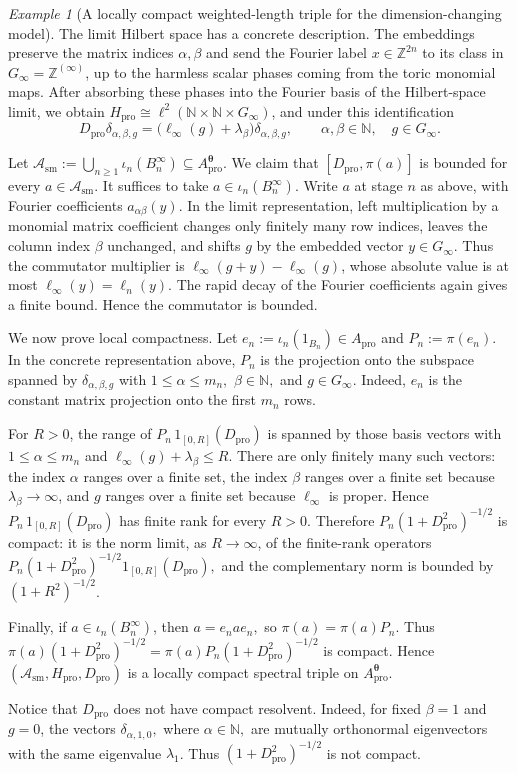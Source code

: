 \documentclass[11pt]{amsart}
\theoremstyle{definition}
\theoremstyle{remark}
\newtheorem{example}[theorem]{Example}
\newcommand{\Z}{\mathbb{Z}}
\newcommand{\N}{\mathbb N}
\newcommand{\ex}{\mathrm{pro}}
\begin{document}
\begin{example}[A locally compact weighted-length triple for the dimension-changing model]
The limit Hilbert space has a concrete description. The embeddings preserve the matrix indices $\alpha,\beta$ and send the
Fourier label $x\in\Z^{2n}$ to its class in
$G_\infty=\Z^{(\infty)}$, up to the harmless scalar phases coming from the
toric monomial maps. After absorbing these phases into the Fourier basis of the
Hilbert-space limit, we obtain $H_{\ex}\cong \ell^2(\N\times\N\times G_\infty)$,
and under this identification
\[
D_{\ex}\delta_{\alpha,\beta,g}
=
\bigl(\ell_\infty(g)+\lambda_\beta\bigr)
\delta_{\alpha,\beta,g},
\qquad
\alpha,\beta\in\N,\quad g\in G_\infty.
\]

Let $\mathcal A_{\mathrm{sm}}:=\bigcup_{n\geq1}\iota_n(B_n^\infty)
\subseteq A_{\ex}^{\boldsymbol\theta}.$
We claim that $[D_{\ex},\pi(a)]$
is bounded for every $a\in\mathcal A_{\mathrm{sm}}$. It suffices to take
$a\in\iota_n(B_n^\infty)$. Write $a$ at stage $n$ as above, with Fourier
coefficients $a_{\alpha\beta}(y)$. In the limit representation, left
multiplication by a monomial matrix coefficient changes only finitely many row
indices, leaves the column index $\beta$ unchanged, and shifts $g$ by the
embedded vector $y\in G_\infty$. Thus the commutator multiplier is $\ell_\infty(g+y)-\ell_\infty(g)$,
whose absolute value is at most $\ell_\infty(y)=\ell_n(y)$. The rapid decay of
the Fourier coefficients again gives a finite bound. Hence the commutator is
bounded.

We now prove local compactness. Let $e_n:=\iota_n(1_{B_n})\in A_{\ex}$ and $P_n:=\pi(e_n).$
In the concrete representation above, $P_n$ is the projection onto the
subspace spanned by $\delta_{\alpha,\beta,g}$ with
$1\leq\alpha\leq m_n,$ $\beta\in\N,$ and $g\in G_\infty.$
Indeed, $e_n$ is the constant matrix projection onto the first $m_n$ rows.

For $R>0$, the range of $P_n\,1_{[0,R]}(D_{\ex})$
is spanned by those basis vectors with $1\leq\alpha\leq m_n$ and $\ell_\infty(g)+\lambda_\beta\leq R.$
There are only finitely many such vectors: the index $\alpha$ ranges over a finite set,
the index $\beta$ ranges over a finite set because $\lambda_\beta\to\infty$, and
$g$ ranges over a finite set because $\ell_\infty$ is proper. Hence $P_n\,1_{[0,R]}(D_{\ex})$
has finite rank for every $R>0$. Therefore $P_n(1+D_{\ex}^2)^{-1/2}$
is compact: it is the norm limit, as $R\to\infty$, of the finite-rank
operators $P_n(1+D_{\ex}^2)^{-1/2}1_{[0,R]}(D_{\ex}),$
and the complementary norm is bounded by $(1+R^2)^{-1/2}$.

Finally, if $a\in\iota_n(B_n^\infty)$, then $a=e_nae_n,$
so $\pi(a)=\pi(a)P_n.$
Thus $\pi(a)(1+D_{\ex}^2)^{-1/2}=\pi(a)P_n(1+D_{\ex}^2)^{-1/2}$
is compact. Hence $(\mathcal A_{\mathrm{sm}},H_{\ex},D_{\ex})$
is a locally compact spectral triple on $A_{\ex}^{\boldsymbol\theta}.$

Notice that $D_{\ex}$ does not have compact resolvent. Indeed, for fixed
$\beta=1$ and $g=0$, the vectors $\delta_{\alpha,1,0},$ where 
$ \alpha\in\N,$
are mutually orthonormal eigenvectors with the same eigenvalue $\lambda_1$.
Thus $(1+D_{\ex}^2)^{-1/2}$ is not compact. 
\end{example}
\end{document}
